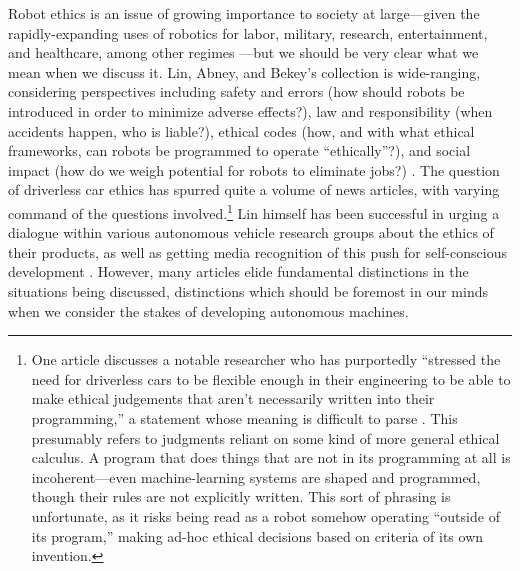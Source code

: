 Robot ethics is an issue of growing importance to society at
large---given the rapidly-expanding uses of robotics for labor, military,
research, entertainment, and healthcare, among other regimes \cite[p. 5-6]{patrickLin}---but we should be very clear what we mean when we
discuss it. Lin, Abney, and Bekey's collection is wide-ranging,
considering perspectives including safety and errors (how should 
robots be introduced in order to minimize adverse effects?), law and
responsibility (when accidents happen, who is liable?), ethical codes
(how, and with what ethical frameworks, can robots be programmed to
operate ``ethically''?), and social impact
(how do we weigh potential for robots to eliminate
jobs?) \cite{robotEthics}. The question of
driverless car ethics has spurred quite a volume of news articles,
with varying command of the questions
involved.\footnote{One article discusses a notable
  researcher who has purportedly ``stressed the need for driverless
  cars to be flexible enough in their 
engineering to be able to make ethical judgements that aren't
necessarily written into their programming,'' a statement whose
meaning is difficult to parse \cite{jessicaDavies}. This
presumably 
refers to judgments reliant on some kind of more general ethical
calculus. A
program that does things that are not in its programming at all is
incoherent---even machine-learning systems are shaped and programmed,
though their rules are not explicitly written. This sort of phrasing is unfortunate, as it 
risks being read as a robot somehow operating ``outside of its
program,'' making ad-hoc ethical decisions based on criteria of its
own invention.} Lin himself has been successful in urging a dialogue
within various autonomous vehicle research groups about the ethics of
their products, as well as getting media recognition of this push for
self-conscious development \cite{timeEthics}. However, many articles
elide fundamental distinctions in the situations being discussed,
distinctions which should be foremost in our minds when we consider
the stakes of developing autonomous machines.

